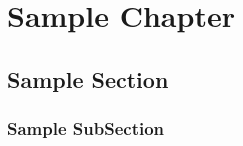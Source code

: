 \chapter{Sample Chapter}

\section{Sample Section}
\label{sec:sample-section}

\subsection{Sample SubSection}


